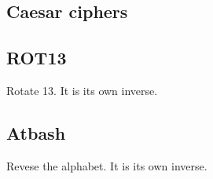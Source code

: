
\subsection{Caesar ciphers}

\subsection{ROT13}

Rotate 13. It is its own inverse.

\subsection{Atbash}

Revese the alphabet. It is its own inverse.

